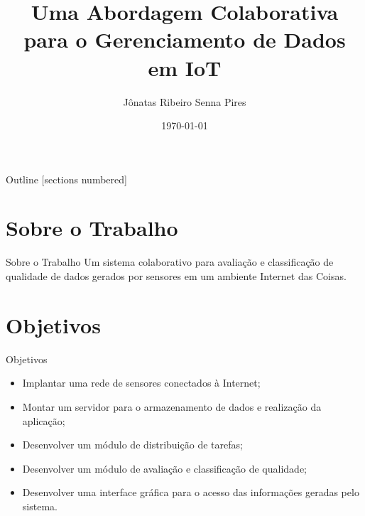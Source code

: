 \documentclass{beamer}
\title{Uma Abordagem Colaborativa para o Gerenciamento de Dados em IoT}
\date{\today}
\author{J\^{o}natas Ribeiro Senna Pires}
\institute{Univesidade de Bras\'{i}lia}
\begin{document}
  \maketitle

  \begin{frame}{Outline}
    [sections numbered]
    \tableofcontents[hideallsubsections]
  \end{frame}

\section{Sobre o Trabalho}
\begin{frame}{Sobre o Trabalho}
  Um sistema colaborativo para avalia\c{c}\~{a}o e classifica\c{c}\~{a}o de qualidade de dados gerados por sensores em um ambiente Internet das Coisas.
\end{frame}

  \section{Objetivos}
  \begin{frame}{Objetivos}
    \begin{itemize}
        \item Implantar uma rede de sensores conectados \`{a} Internet;
        \item Montar um servidor para o armazenamento de dados e realiza\c{c}\~{a}o da aplica\c{c}\~{a}o;
        \item Desenvolver um m\'{o}dulo de distribui\c{c}\~{a}o de tarefas;
        \item Desenvolver um m\'{o}dulo de avalia\c{c}\~{a}o e classifica\c{c}\~{a}o de qualidade;
        \item Desenvolver uma interface gr\'{a}fica para o acesso das informa\c{c}\~{o}es geradas pelo sistema.
    \end{itemize}
  \end{frame}
\end{document}
